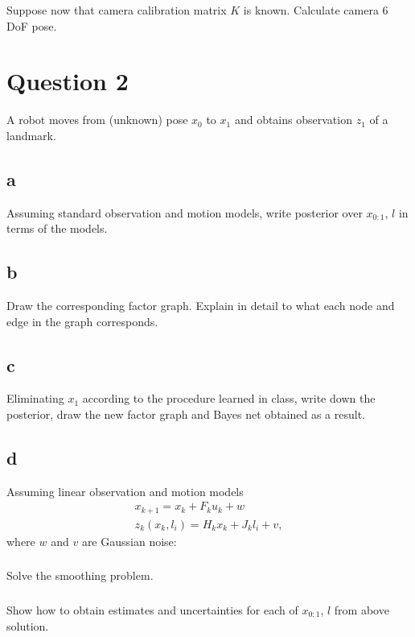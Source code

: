 \documentclass[a4paper]{scrreprt}
\begin{document}
\subsection{}
Suppose now that camera calibration matrix $K$ is known. Calculate camera 6 DoF 
pose. 

\chapter{Question 2}
A robot moves from (unknown) pose $x_0$ to $x_1$ and obtains observation $z_1$ 
of a landmark. 
\section{a}
Assuming standard observation and motion models, write posterior over 
$x_{0:1}$, $l$ in terms of the models. 

\section{b}
Draw the corresponding factor graph. Explain in detail to what each node and 
edge in the graph corresponds. 

\section{c}
Eliminating $x_1$ according to the procedure learned in class, write down the 
posterior, draw the new factor graph and Bayes net obtained as a result. 

\section{d}
Assuming linear observation and motion models
\begin{gather}
	x_{k+1} = x_k+F_ku_k+w \\
	z_k(x_k, l_i) = H_kx_k +J_kl_i + v , 
\end{gather}
where $w$ and $v$ are Gaussian noise: 
\subsection{}
Solve the smoothing problem. 

\subsection{}
Show how to obtain estimates and uncertainties for each of $x_{0:1}$, $l$ from 
above solution. 
\end{document}
